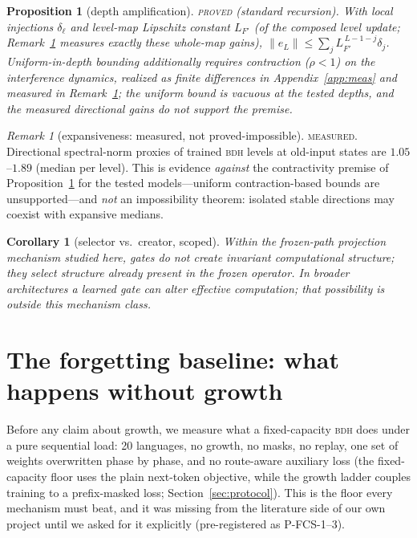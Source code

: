 \documentclass[11pt]{article}
\newtheorem{proposition}{Proposition}
\newtheorem{corollary}{Corollary}
\theoremstyle{definition}\newtheorem{definition}{Definition}
\theoremstyle{remark}\newtheorem{remark}{Remark}
\newcommand{\BDH}{\textsc{bdh}}
\begin{document}
\begin{proposition}[depth amplification]\label{prop:amp}
\textsc{proved} (standard recursion). With local injections $\delta_\ell$ and level-map
Lipschitz constant $L_{F'}$ (of the composed level update; Remark~\ref{rem:exp} measures
exactly these whole-map gains), $\|e_L\|\le\sum_j L_{F'}^{\,L-1-j}\delta_j$. Uniform-in-depth
bounding additionally requires contraction ($\rho<1$) on the interference dynamics, realized as finite differences in Appendix~\ref{app:meas} and measured in Remark~\ref{rem:exp}; the uniform bound is vacuous at the tested depths, and the measured directional gains do not support the premise.
\end{proposition}

\begin{remark}[expansiveness: measured, not proved-impossible]\label{rem:exp}
\textsc{measured.} Directional spectral-norm proxies of trained \BDH{} levels at old-input
states are $1.05$--$1.89$ (median per level). This is evidence \emph{against} the
contractivity premise of Proposition~\ref{prop:amp} for the tested models---uniform
contraction-based bounds are unsupported---and \emph{not} an impossibility theorem: isolated
stable directions may coexist with expansive medians.
\end{remark}

\begin{corollary}[selector vs.\ creator, scoped]\label{cor:sel}
Within the frozen-path projection mechanism studied here, gates do not create invariant
computational structure; they select structure already present in the frozen operator. In
broader architectures a learned gate can alter effective computation; that possibility is
outside this mechanism class.
\end{corollary}

\section{The forgetting baseline: what happens without growth}
\label{sec:fcs}

Before any claim about growth, we measure what a fixed-capacity \BDH{} does under a
pure sequential load: 20 languages, no growth, no masks, no replay, one set of weights
overwritten phase by phase, and no route-aware auxiliary loss (the fixed-capacity floor uses the plain next-token objective, while the growth ladder couples training to a prefix-masked loss; Section~\ref{sec:protocol}). This is the floor every mechanism must beat, and it was
missing from the literature side of our own project until we asked for it
explicitly (pre-registered as P-FCS-1--3).
\end{document}

